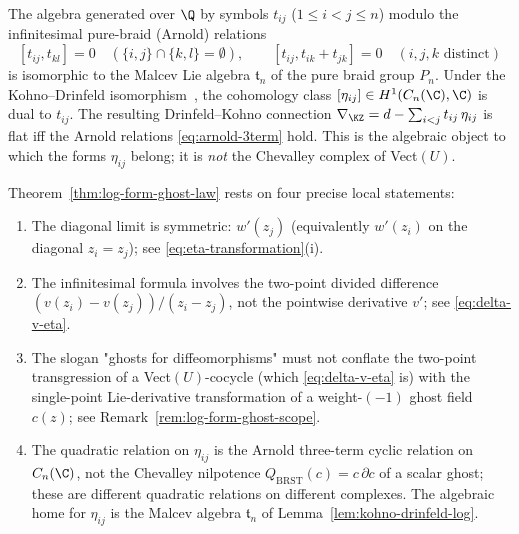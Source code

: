 \begin{lemma}
\label{lem:kohno-drinfeld-log}
The algebra generated over $\Q$ by symbols $t_{ij}$ ($1 \leq i < j \leq n$)
modulo the infinitesimal pure-braid (Arnold) relations
\[
[t_{ij}, t_{kl}] = 0 \quad (\{i,j\} \cap \{k,l\} = \emptyset),
\qquad
[t_{ij}, t_{ik} + t_{jk}] = 0 \quad (i,j,k \text{ distinct})
\]
is isomorphic to the Malcev Lie algebra $\mathfrak{t}_n$ of the
pure braid group $P_n$. Under the Kohno--Drinfeld
isomorphism~\cite{Kohno87,Drinfeld90}, the
cohomology class $[\eta_{ij}] \in H^{1}(C_n(\C),\C)$ is dual to
$t_{ij}$. The resulting Drinfeld--Kohno connection
$\nabla_{\KZ} = d - \sum_{i<j} t_{ij}\,\eta_{ij}$ is flat iff the
Arnold relations \eqref{eq:arnold-3term} hold. This is the
algebraic object to which the forms $\eta_{ij}$ belong; it is
\emph{not} the Chevalley complex of Vect$(U)$.
\end{lemma}

\begin{remark}
\label{rem:log-form-ghost-corrections}
Theorem~\ref{thm:log-form-ghost-law} rests on four precise local
statements:
\begin{enumerate}[label=(E\arabic*)]
\item The diagonal limit is symmetric: $w'(z_j)$ (equivalently
$w'(z_i)$ on the diagonal $z_i = z_j$); see
\eqref{eq:eta-transformation}(i).
\item The infinitesimal formula involves the two-point divided
difference $(v(z_i) - v(z_j))/(z_i - z_j)$, not the pointwise
derivative $v'$; see \eqref{eq:delta-v-eta}.
\item The slogan "ghosts for diffeomorphisms" must not conflate the
two-point transgression of a Vect$(U)$-cocycle (which
\eqref{eq:delta-v-eta} is) with the single-point Lie-derivative
transformation of a weight-$(-1)$ ghost field $c(z)$; see
Remark~\ref{rem:log-form-ghost-scope}.
\item The quadratic relation on $\eta_{ij}$ is the Arnold
three-term cyclic relation on $C_n(\C)$, not the Chevalley
nilpotence $Q_{\mathrm{BRST}}(c) = c\,\partial c$ of a scalar ghost;
these are different quadratic relations on different complexes.
The algebraic home for $\eta_{ij}$ is the Malcev algebra
$\mathfrak{t}_n$ of Lemma~\ref{lem:kohno-drinfeld-log}.
\end{enumerate}
\end{remark}

